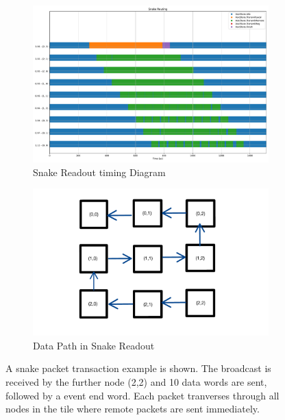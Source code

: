 \begin{figure}
\centering
\begin{subfigure}{.5\textwidth}
  \centering
  \includegraphics[width=\textwidth]{images/snake_timer.pdf}
  \caption{Snake Readout timing Diagram}
\end{subfigure}%
\begin{subfigure}{.5\textwidth}
  \centering
  \includegraphics[width=\textwidth]{images/snake_ex_read.pdf}
  \caption{Data Path in Snake Readout}
\end{subfigure}
\caption{A snake packet transaction example is shown. The broadcast is received by the further node (2,2) and 10 data words are sent, followed by a event end word.
Each packet tranverses through all nodes in the tile where remote packets are sent immediately.}
\label{fig:snake_timer}
\end{figure}

